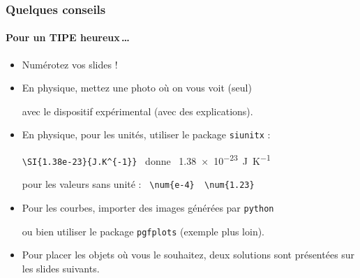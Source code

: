 \documentclass[a4paper,11pt]{beamer}
\begin{document}

\begin{frame}[fragile]

\frametitle{Quelques conseils}
\framesubtitle{Pour un TIPE heureux\,\dots}

\begin{itemize}\setlength{\itemsep}{5mm}

\item Numérotez vos slides !

\item En physique, mettez une photo où on vous voit (seul)

avec le dispositif expérimental (avec des explications).

\item En physique, pour les unités, utiliser le package \texttt{siunitx} :

\medskip

\verb|\SI{1.38e-23}{J.K^{-1}}| \ donne \ \SI{1.38e-23}{J.K^{-1}}

\smallskip

pour les valeurs sans unité : \verb| \num{e-4}  \num{1.23}|

\item Pour les courbes, importer des images générées par \texttt{python}

ou bien utiliser le package \texttt{pgfplots} (exemple plus loin).

\item Pour placer les objets où vous le souhaitez, deux solutions sont présentées sur les slides suivants.

\end{itemize}

\end{frame}

\end{document}
